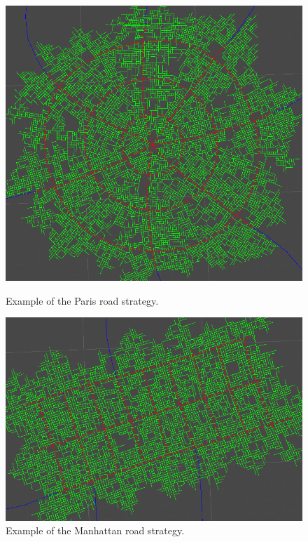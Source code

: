\begin{figure}[H]
  \centering
  \begin{minipage}{.45\textwidth}
    \centering
    \begin{minipage}{.9\textwidth}
      \centering
      \includegraphics[width=\textwidth]{figure/road_network_paris.png}
      \caption{Example of the Paris road strategy.}
      \label{fig:road_network_paris}
    \end{minipage}
  \end{minipage}
  \begin{minipage}{.45\textwidth}
    \begin{minipage}{.9\textwidth}
      \centering
      \centering
      \includegraphics[width=\textwidth]{figure/road_network_manhattan.png}
      \caption{Example of the Manhattan road strategy.}
      \label{fig:road_network_manhattan}
    \end{minipage}
  \end{minipage}
\end{figure}


